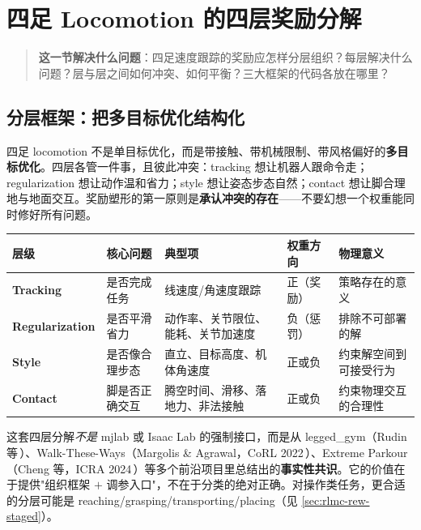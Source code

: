 \section{四足 Locomotion 的四层奖励分解}
\label{sec:rlmc-rew-layers}

\begin{quote}\small
\textbf{这一节解决什么问题}：四足速度跟踪的奖励应怎样分层组织？每层解决什么问题？层与层之间如何冲突、如何平衡？三大框架的代码各放在哪里？
\end{quote}

\subsection{分层框架：把多目标优化结构化}
\label{sec:rlmc-rew-fourlayers}

四足 locomotion 不是单目标优化，而是带接触、带机械限制、带风格偏好的\textbf{多目标优化}。四层各管一件事，且彼此冲突：tracking 想让机器人跟命令走；regularization 想让动作温和省力；style 想让姿态步态自然；contact 想让脚合理地与地面交互。奖励塑形的第一原则是\textbf{承认冲突的存在}——不要幻想一个权重能同时修好所有问题。

\begin{center}
\small
\begin{tabular}{@{}lllll@{}}
\toprule
层级 & 核心问题 & 典型项 & 权重方向 & 物理意义 \\
\midrule
\textbf{Tracking} & 是否完成任务 & 线速度/角速度跟踪 & 正（奖励） & 策略存在的意义 \\
\textbf{Regularization} & 是否平滑省力 & 动作率、关节限位、能耗、关节加速度 & 负（惩罚） & 排除不可部署的解 \\
\textbf{Style} & 是否像合理步态 & 直立、目标高度、机体角速度 & 正或负 & 约束解空间到可接受行为 \\
\textbf{Contact} & 脚是否正确交互 & 腾空时间、滑移、落地力、非法接触 & 正或负 & 约束物理交互的合理性 \\
\bottomrule
\end{tabular}
\end{center}

\begin{insight}\label{ins:rlmc-rew-consensus}
这套四层分解\emph{不是} mjlab 或 Isaac Lab 的强制接口，而是从 legged\_gym（Rudin 等\,\cite{rudin2021minutes}）、Walk-These-Ways（Margolis \& Agrawal，CoRL 2022\,\cite{margolis2022walk}）、Extreme Parkour（Cheng 等，ICRA 2024\,\cite{cheng2024parkour}）等多个前沿项目里总结出的\textbf{事实性共识}。它的价值在于提供"组织框架 $+$ 调参入口"，不在于分类的绝对正确。对操作类任务，更合适的分层可能是 reaching/grasping/transporting/placing（见 \cref{sec:rlmc-rew-staged}）。
\end{insight}

